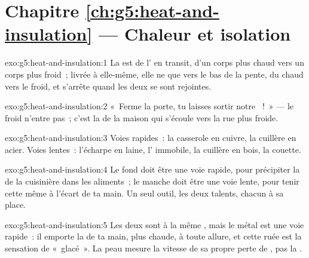 \section*{Chapitre \ref{ch:g5:heat-and-insulation} --- Chaleur et isolation}

\begin{solution}{exo:g5:heat-and-insulation:1}
La  est de l' en transit, d'un corps plus chaud vers un
corps plus froid~; livrée à elle-même, elle ne  que vers le bas
de la pente, du chaud vers le froid, et s'arrête quand les deux
 se sont rejointes.
\end{solution}

\begin{solution}{exo:g5:heat-and-insulation:2}
«~Ferme la porte, tu laisses sortir notre ~!~» --- le froid
n'entre pas~; c'est la  de la maison qui s'écoule vers la rue
plus froide.
\end{solution}

\begin{solution}{exo:g5:heat-and-insulation:3}
Voies rapides~: la casserole en cuivre, la cuillère en acier. Voies
lentes~: l'écharpe en laine, l' immobile, la cuillère en bois, la
couette.
\end{solution}

\begin{solution}{exo:g5:heat-and-insulation:4}
Le fond doit être une voie rapide, pour précipiter la  de la
cuisinière dans les aliments~; le manche doit être une voie lente,
pour tenir cette même  à l'écart de ta main. Un seul outil,
les deux talents, chacun à sa place.
\end{solution}

\begin{solution}{exo:g5:heat-and-insulation:5}
Les deux sont à la même , mais le métal est une voie
rapide~: il emporte la  de ta main, plus chaude, à toute
allure, et cette ruée est la sensation de «~glacé~». La peau mesure
la vitesse de sa propre perte de , pas la .
\end{solution}

